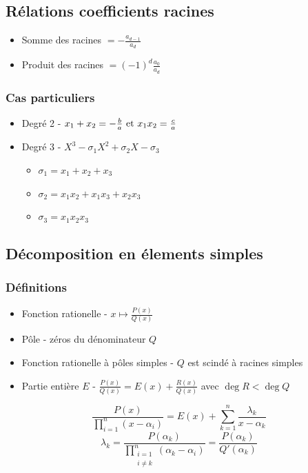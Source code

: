 \documentclass[openany]{book}
\begin{document}
\subsection{Rélations coefficients racines}
\begin{itemize}
    \item Somme des racines $ = -\frac{a_{d-1}}{a_d} $
    \item Produit des racines $ = (-1)^d \frac{a_0}{a_d} $
\end{itemize}

\subsubsection{Cas particuliers}
\begin{itemize}
    \item Degré 2 - $x_1 + x_2 = -\frac{b}{a} \text{ et } x_1x_2 = \frac{c}{a}$
    \item Degré 3 - $X^3 - \sigma_1 X^2 + \sigma_2 X - \sigma_3$
    \begin{itemize}
        \item $\sigma_1 = x_1 + x_2 + x_3$
        \item $\sigma_2 = x_1x_2 + x_1x_3 + x_2x_3$
        \item $\sigma_3 = x_1 x_2 x_3$
    \end{itemize}
\end{itemize}

\subsection{Décomposition en élements simples}
\subsubsection{Définitions}
\begin{itemize}
    \item Fonction rationelle - $x \mapsto \frac{P(x)}{Q(x)}$
    \item Pôle - zéros du dénominateur $Q$
    \item Fonction rationelle à pôles simples - $Q$ est scindé à racines simples
    \item Partie entière $E$ - $ \frac{P(x)}{Q(x)} = E(x) + \frac{R(x)}{Q(x)} $ avec $\deg R < \deg Q$
\end{itemize}

\[ \frac{P(x)}{\prod_{i=1}^n (x- \alpha_i) } = E(x) + \sum_{k=1}^{n} \frac{\lambda_k}{x-\alpha_k} \]
\[ \lambda_k = \frac{P(\alpha_k)}{\prod_{\substack{i=1 \\ i \neq k}}^{n}(\alpha_k - \alpha_i)} = \frac{P(\alpha_k)}{Q'(\alpha_k)} \]
\end{document}
